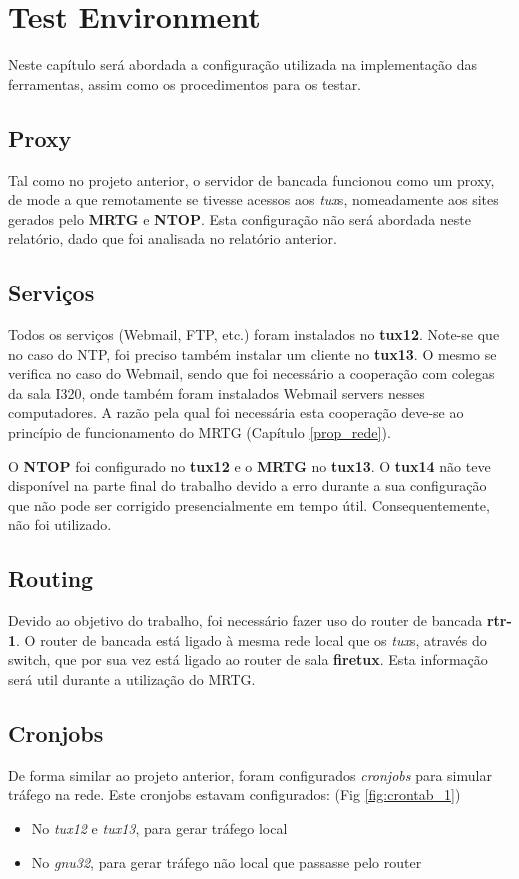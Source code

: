 \chapter{Test Environment} \label{test}

Neste capítulo será abordada a configuração utilizada na implementação das ferramentas, assim como os procedimentos para os testar.

\section{Proxy}
Tal como no projeto anterior, o servidor de bancada funcionou como um proxy, de mode a que remotamente se tivesse acessos aos \textit{tux}s, nomeadamente aos sites gerados pelo \textbf{MRTG} e \textbf{NTOP}.
Esta configuração não será abordada neste relatório, dado que foi analisada no relatório anterior.

\section{Serviços}
Todos os serviços (Webmail, FTP, etc.) foram instalados no \textbf{tux12}. Note-se que no caso do NTP, foi preciso também instalar um cliente no \textbf{tux13}.
O mesmo se verifica no caso do Webmail, sendo que foi necessário a cooperação com colegas da sala I320, onde também foram instalados Webmail servers nesses computadores. 
A razão pela qual foi necessária esta cooperação deve-se ao princípio de funcionamento do MRTG (Capítulo \ref{prop_rede}).

O \textbf{NTOP} foi configurado no \textbf{tux12} e o \textbf{MRTG} no \textbf{tux13}.
O \textbf{tux14} não teve disponível na parte final do trabalho devido a erro durante a sua configuração que não pode ser corrigido presencialmente em tempo útil. Consequentemente, não foi utilizado.

\section{Routing}
Devido ao objetivo do trabalho, foi necessário fazer uso do router de bancada \textbf{rtr-1}.
O router de bancada está ligado à mesma rede local que os \textit{tux}s, através do switch, que por sua vez está ligado ao router de sala \textbf{firetux}.
Esta informação será util durante a utilização do MRTG.


\section{Cronjobs}
De forma similar ao projeto anterior, foram configurados \textit{cronjobs} para simular tráfego na rede. Este cronjobs estavam configurados: (Fig \ref{fig:crontab_1})
\begin{itemize}
    \item No \textit{tux12} e \textit{tux13}, para gerar tráfego local
    \item No \textit{gnu32}, para gerar tráfego não local que passasse pelo router
\end{itemize}

